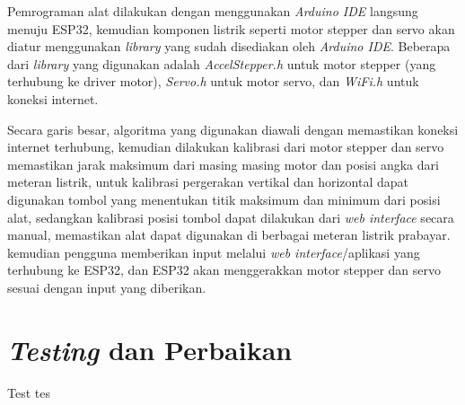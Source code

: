 Pemrograman alat dilakukan dengan menggunakan \textit{Arduino IDE} langsung menuju ESP32, kemudian komponen listrik
seperti motor stepper dan servo akan diatur menggunakan \textit{library} yang sudah disediakan oleh \textit{Arduino IDE}.
Beberapa dari \textit{library} yang digunakan adalah \textit{AccelStepper.h} untuk motor stepper (yang terhubung ke driver motor), 
\textit{Servo.h} untuk motor servo, dan \textit{WiFi.h} untuk koneksi internet. 

Secara garis besar,
algoritma yang digunakan diawali dengan memastikan koneksi internet terhubung, kemudian dilakukan
kalibrasi dari motor stepper dan servo memastikan jarak maksimum dari masing masing motor dan posisi
angka dari meteran listrik, untuk kalibrasi pergerakan vertikal dan horizontal dapat digunakan tombol yang menentukan titik
maksimum dan minimum dari posisi alat, sedangkan kalibrasi posisi tombol dapat dilakukan dari \textit{web interface} secara manual,
memastikan alat dapat digunakan di berbagai meteran listrik prabayar.
kemudian pengguna memberikan input melalui \textit{web interface}/aplikasi yang terhubung ke ESP32,
dan ESP32 akan menggerakkan motor stepper dan servo sesuai dengan input yang diberikan.

\section{\textit{Testing} dan Perbaikan}

Test tes